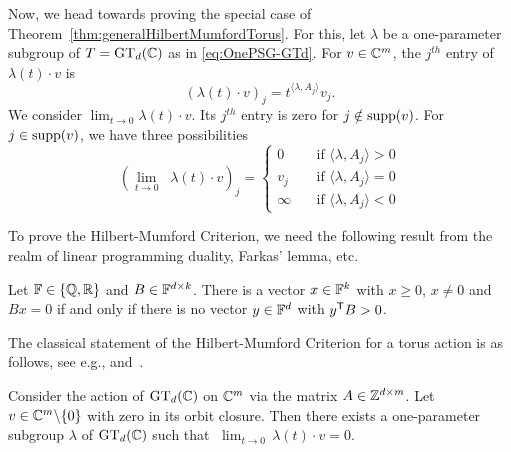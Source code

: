 Now, we head towards proving  the special case of Theorem~\ref{thm:generalHilbertMumfordTorus}. For this, let $\lambda$ be a one-parameter subgroup of $T = \operatorname{GT}_d(\mathbb C)$ as in \eqref{eq:OnePSG-GTd}.
For $v \in \mathbb C^m$, the $j^{th}$ entry of $\lambda(t) \cdot v$ is
\[ 
(\lambda(t) \cdot v)_j = t^{\langle \lambda, A_j \rangle} v_j . 
\] 
We consider $\lim_{t \to 0} \lambda(t) \cdot v$. Its $j^{th}$ entry is zero for $j \notin \operatorname{supp}(v)$. For $j \in \operatorname{supp}(v)$, we have three possibilities
\begin{equation}\label{eq:1psgLimit}
	\left(\lim_{t \to 0} \;\; \lambda(t) \cdot v \right)_j =
	\begin{cases}
		0       & \quad \text{if } \langle \lambda, A_j \rangle > 0\\
		v_j     & \quad \text{if } \langle \lambda, A_j \rangle = 0\\
		\infty  & \quad \text{if } \langle \lambda, A_j \rangle < 0
	\end{cases}
\end{equation}

To prove the Hilbert-Mumford Criterion, we need the following result from the realm of linear programming duality, Farkas' lemma, etc.

\begin{theorem} \label{thm:Gordan}
	Let $\mathbb F \in \{\mathbb Q, \mathbb R\}$  and $B \in \mathbb F^{d \times k}$. There is a vector $x \in \mathbb F^k$ with $x \geq 0$, $x \neq 0$ and $Bx = 0$ if and only if there is no vector $y \in \mathbb F^d$ with $y^{\mathsf{T}} B > 0$.
\end{theorem}

The classical statement of the Hilbert-Mumford Criterion for a torus action is as follows, see e.g., \cite[Proposition~5.3]{PopovVinberg} and~\cite[Lemma~3.4]{birkes1971orbits}.

\begin{theorem}\label{thm:specialHilbertMumford}
	Consider the action of $\operatorname{GT}_d(\mathbb C)$ on $\mathbb C^m$ via the matrix $A \in \mathbb Z^{d \times m}$. Let $v \in \mathbb C^m \backslash \{0\}$ with zero in its orbit closure. Then there exists a one-parameter subgroup $\lambda$ of $\operatorname{GT}_d(\mathbb C)$ such that $\; \lim_{t \to 0} \, \lambda(t) \cdot v = 0$.
\end{theorem}

